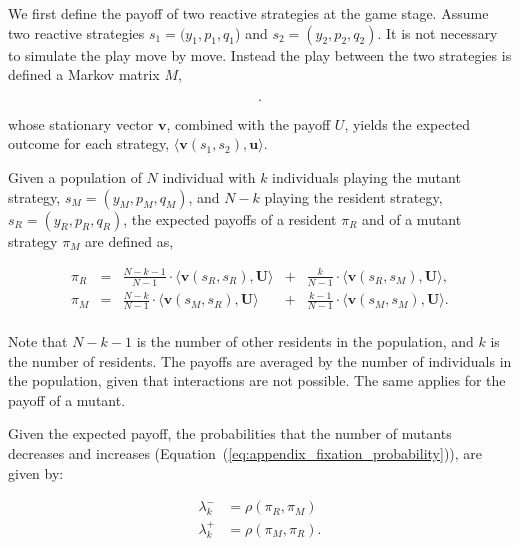 \documentclass[11pt]{article}
\theoremstyle{plainCl1}
\theoremstyle{plainCl2}
\begin{document}
We first define the payoff of two reactive strategies at the game stage. Assume
two reactive strategies $s_1\!=\!(y_1, p_1, q_1$) and $s_2\!=\!(y_2,p_2,q_2)$.
It is not necessary to simulate the play move by move. Instead the play between
the two strategies is defined a Markov matrix \(M\), 

\begin{equation}\label{eq:transition_matrix}
  .
\end{equation}

whose stationary vector \(\mathbf{v}\), combined with the payoff \(U\), yields
the expected outcome for each strategy,
\(\langle\mathbf{v}(s_1,s_2),\mathbf{u}\rangle\).

Given a population of \(N\) individual with \(k\) individuals playing the mutant
strategy, \(s_M = (y_M, p_M, q_M)\), and \(N -k\) playing the resident strategy,
\(s_R = (y_R, p_R, q_R)\), the expected payoffs of a resident \(\pi_R\) and of
a mutant strategy \(\pi_M\) are defined as,

\begin{equation} \label{Eq:ExpPay}
  \begin{array}{lcrcr}
  \displaystyle \pi_R	&=	&\displaystyle \frac{N\!-\!k\!-\!1}{N-1}\cdot \langle\mathbf{v}(s_R,s_R),\mathbf{U}\rangle	&+	&\displaystyle\frac{k}{N-1}\cdot \langle\mathbf{v}(s_R,s_M),\mathbf{U}\rangle,\\[0.5cm]
  \displaystyle \pi_M	&=	&\displaystyle\frac{N-k}{N-1}\cdot \langle\mathbf{v}(s_M,s_R),\mathbf{U}\rangle&+	&\displaystyle\frac{k-1}{N-1}\cdot \langle\mathbf{v}(s_M,s_M),\mathbf{U}\rangle.\\
  \end{array}
\end{equation}

Note that \(N\!-\!k\!-\!1\) is the number of other residents in the population,
and \(k\) is the number of residents. The payoffs are averaged by the number of
individuals in the population, given that interactions are not possible.
The same applies for the payoff of a mutant.

Given the expected payoff, the probabilities that the number of mutants
decreases and increases  (Equation~(\ref{eq:appendix_fixation_probability})),
are given by:

\begin{align*} 
  \lambda^-_k &\!=\!\rho(\pi_R, \pi_M) \\
  \lambda^+_k &\!=\!\rho(\pi_M, \pi_R).
\end{align*}
\end{document}
